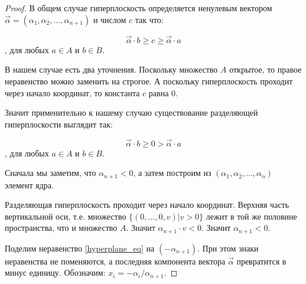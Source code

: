 \begin{proof}
В общем случае гиперплоскость определяется ненулевым вектором $\vec{\alpha}=(\alpha_{1},\alpha_{2},...,\alpha_{n+1})$ и числом $c$ так что:

\begin{equation}
	\vec{\alpha}\cdot b \geq c \geq \vec{\alpha}\cdot a
\end{equation},
для любых $a\in A$ и $b\in B$.

В нашем случае есть два уточнения. Поскольку множество $A$ открытое, то правое неравенство можно заменить на строгое.
А поскольку гиперплоскость проходит через начало координат, то константа $c$ равна 0.

Значит применительно к нашему случаю существование разделяющей гиперплоскости выглядит так:

\begin{equation}
\label{hyperplane_eq}
	\vec{\alpha}\cdot b \geq 0 > \vec{\alpha}\cdot a
\end{equation},
для любых $a\in A$ и $b\in B$.


Сначала мы заметим, что $\alpha_{n+1}<0$, а затем построим из $(\alpha_{1},\alpha_{2},...,\alpha_{n})$ элемент ядра.

Разделяющая гиперплоскость проходит через начало координат. Верхняя часть вертикальной оси, т.е. множество $\{(0,...,0,v)|v>0\}$ лежит в той же половине пространства, что и множество $A$. Значит $\alpha_{n+1}\cdot v<0$. Значит $\alpha_{n+1}<0$.





Поделим неравенство \ref{hyperplane_eq} на $(-\alpha_{n+1})$. При этом знаки неравенства не поменяются, а последняя компонента вектора $\vec{\alpha}$ превратится в минус единицу. Обозначим: $x_{i}=-\alpha_{i}/\alpha_{n+1}$.


\end{proof}
